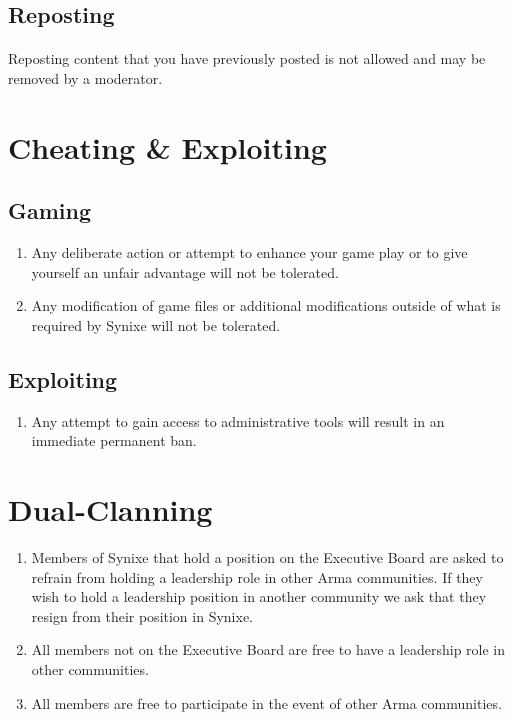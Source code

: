 \documentclass[10pt,a4paper]{article}
\begin{document}
\subsection{Reposting}
\paragraph{}
Reposting content that you have previously posted is not allowed and may be removed by a moderator.
\section{Cheating \& Exploiting} \label{cheating}
\subsection{Gaming}
\begin{enumerate}
	\item Any deliberate action or attempt to enhance your game play or to give yourself an unfair advantage will not be tolerated.
	\item Any modification of game files or additional modifications outside of what is required by Synixe will not be tolerated.
\end{enumerate}
\subsection{Exploiting}
\begin{enumerate}
	\item Any attempt to gain access to administrative tools will result in an immediate permanent ban.
\end{enumerate}
\section{Dual-Clanning} \label{dual-clan}
\begin{enumerate}
	\item Members of Synixe that hold a position on the Executive Board are asked to refrain from holding a leadership role in other Arma communities. If they wish to hold a leadership position in another community we ask that they resign from their position in Synixe.
	\item All members not on the Executive Board are free to have a leadership role in other communities.
	\item All members are free to participate in the event of other Arma communities.
\end{enumerate}
\end{document}
